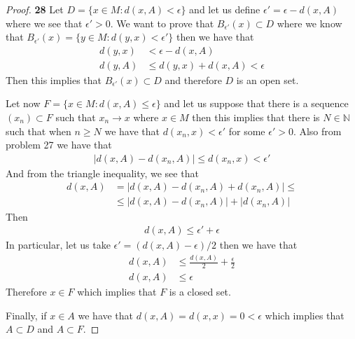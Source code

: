 \documentclass[11pt]{article}
\newcommand{\N}{\mathbb{N}}
\theoremstyle{definition}
\begin{document}
    \begin{proof}{\textbf{28}}
        Let $D = \{x \in M: d(x,A) < \epsilon\}$ and let us define
        $\epsilon' = \epsilon - d(x,A)$ where we see that $\epsilon' > 0$.
        We want to prove that $B_{\epsilon'}(x) \subset D$ where we know that
        $B_{\epsilon'}(x) = \{y \in M:d(y,x) < \epsilon'\}$ then we have that
        \begin{align*}
            d(y,x) &< \epsilon - d(x,A)\\
            d(y,A) &\leq d(y,x) + d(x,A) < \epsilon
        \end{align*}
        Then this implies that $B_{\epsilon'}(x) \subset D$ and therefore $D$ is
        an open set.

        Let now $F = \{x \in M: d(x,A) \leq \epsilon\}$ and let us suppose that
        there is a sequence $(x_n) \subset F$ such that $x_n \to x$ where
        $x \in M$ then this implies that there is
        $N\in \N$ such that when $n \geq N$ we have that
        $d(x_n, x) < \epsilon'$ for some $\epsilon' > 0$. Also from problem 27
        we have that
        \begin{align*}
            |d(x, A) - d(x_n, A)| \leq d(x_n, x) < \epsilon'
        \end{align*}
        And from the triangle inequality, we see that
        \begin{align*}
            d(x, A) &= |d(x, A) - d(x_n, A) + d(x_n, A)| \leq\\
                &\leq|d(x, A) - d(x_n, A)| + |d(x_n, A)|
        \end{align*}
        Then
        \begin{align*}
            d(x,A) \leq \epsilon' + \epsilon
        \end{align*}
        In particular, let us take $\epsilon' = (d(x,A) - \epsilon)/2$ then
        we have that
        \begin{align*}
            d(x,A) &\leq \frac{d(x,A)}{2} + \frac{\epsilon}{2}\\
            d(x,A) &\leq \epsilon
        \end{align*}
        Therefore $x \in F$ which implies that $F$ is a closed set.

        Finally, if $x \in A$ we have that $d(x,A) = d(x,x) = 0 < \epsilon$
        which implies that $A \subset D$ and $A \subset F$.
    \end{proof}
\cleardoublepage
\end{document}
